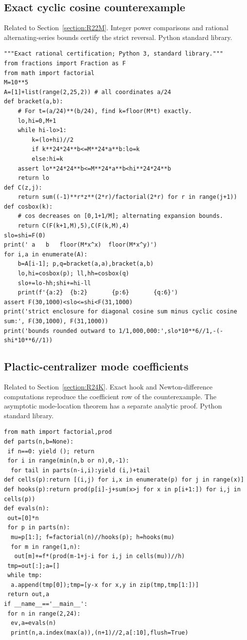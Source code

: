 \documentclass[11pt,a4paper]{article}
\begin{document}
\subsection{Exact cyclic cosine counterexample}
\noindent Related to Section~\ref{section:R22M}. Integer power comparisons and rational alternating-series bounds certify the strict reversal. Python standard library.

\begin{Verbatim}[fontsize=\scriptsize,breaklines,breakanywhere]
"""Exact rational certification; Python 3, standard library."""
from fractions import Fraction as F
from math import factorial
M=10**5
A=[1]+list(range(2,25,2)) # all coordinates a/24
def bracket(a,b):
    # For t=(a/24)**(b/24), find k=floor(M*t) exactly.
    lo,hi=0,M+1
    while hi-lo>1:
        k=(lo+hi)//2
        if k**24*24**b<=M**24*a**b:lo=k
        else:hi=k
    assert lo**24*24**b<=M**24*a**b<hi**24*24**b
    return lo
def C(z,j):
    return sum((-1)**r*z**(2*r)/factorial(2*r) for r in range(j+1))
def cosbox(k):
    # cos decreases on [0,1+1/M]; alternating expansion bounds.
    return C(F(k+1,M),5),C(F(k,M),4)
slo=shi=F(0)
print(' a   b   floor(M*x^x)  floor(M*x^y)')
for i,a in enumerate(A):
    b=A[i-1]; p,q=bracket(a,a),bracket(a,b)
    lo,hi=cosbox(p); ll,hh=cosbox(q)
    slo+=lo-hh;shi+=hi-ll
    print(f'{a:2}  {b:2}       {p:6}       {q:6}')
assert F(30,1000)<slo<=shi<F(31,1000)
print('strict enclosure for diagonal cosine sum minus cyclic cosine sum:', F(30,1000), F(31,1000))
print('bounds rounded outward to 1/1,000,000:',slo*10**6//1,-(-shi*10**6//1))
\end{Verbatim}
\subsection{Plactic-centralizer mode coefficients}
\noindent Related to Section~\ref{section:R24K}. Exact hook and Newton-difference computations reproduce the coefficient row of the counterexample. The asymptotic mode-location theorem has a separate analytic proof. Python standard library.

\begin{Verbatim}[fontsize=\scriptsize,breaklines,breakanywhere]
from math import factorial,prod
def parts(n,b=None):
 if n==0: yield (); return
 for i in range(min(n,b or n),0,-1):
  for tail in parts(n-i,i):yield (i,)+tail
def cells(p):return [(i,j) for i,x in enumerate(p) for j in range(x)]
def hooks(p):return prod(p[i]-j+sum(x>j for x in p[i+1:]) for i,j in cells(p))
def evals(n):
 out=[0]*n
 for p in parts(n):
  mu=p[1:]; f=factorial(n)//hooks(p); h=hooks(mu)
  for m in range(1,n):
   out[m]+=f*(prod(m-1+j-i for i,j in cells(mu))//h)
 tmp=out[:];a=[]
 while tmp:
  a.append(tmp[0]);tmp=[y-x for x,y in zip(tmp,tmp[1:])]
 return out,a
if __name__=='__main__':
 for n in range(2,24):
  ev,a=evals(n)
  print(n,a.index(max(a)),(n+1)//2,a[:10],flush=True)
\end{Verbatim}
\end{document}
